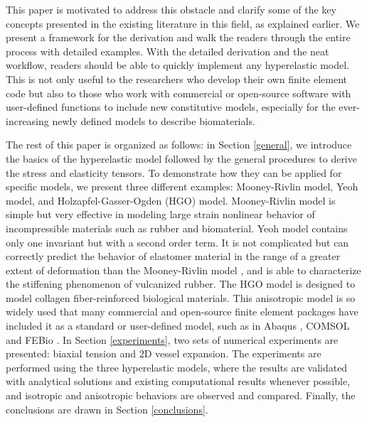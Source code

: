 This paper is motivated to address this obstacle and clarify some of the key concepts presented in the existing literature in this field, as explained earlier. We present a framework for the derivation and walk the readers through the entire process with detailed examples. With the detailed derivation and the neat workflow, readers should be able to quickly implement any hyperelastic model. This is not only useful to the researchers who develop their own finite element code but also to those who work with commercial or open-source software with user-defined functions to include new constitutive models, especially for the ever-increasing newly defined models to describe biomaterials.

The rest of this paper is organized as follows: in Section \ref{general}, we introduce the basics of the hyperelastic model followed by the general procedures to derive the stress and elasticity tensors. To demonstrate how they can be applied for specific models, we present three different examples: Mooney-Rivlin model, Yeoh model, and Holzapfel-Gasser-Ogden (HGO) model. Mooney-Rivlin model is simple but very effective in modeling large strain nonlinear behavior of incompressible materials such as rubber and biomaterial. Yeoh model contains only one invariant but with a second order term. It is not complicated but can correctly predict the behavior of elastomer material in the range of a greater extent of deformation than the Mooney-Rivlin model \cite{Gajewski}, and is able to characterize the stiffening phenomenon of vulcanized rubber. The HGO model is designed to model collagen fiber-reinforced biological materials. This anisotropic model is so widely used that many commercial and open-source finite element packages have included it as a standard or user-defined model,  such as in Abaqus \cite{Abaqus}, COMSOL \cite{COMSOL} and FEBio \cite{FEBio}. In Section \ref{experiments}, two sets of numerical experiments are presented: biaxial tension and $2$D vessel expansion. The experiments are performed using the three hyperelastic models, where the results are validated with analytical solutions and existing computational results whenever possible, and isotropic and anisotropic behaviors are observed and compared. Finally, the conclusions are drawn in Section \ref{conclusions}.




 



